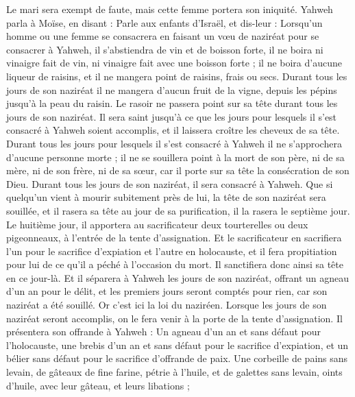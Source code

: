\begin{multicols}{2}
Le mari sera exempt de faute, mais cette femme portera son iniquité.
\VerseOne{}Yahweh parla à Moïse, en disant :
Parle aux enfants d'Israël, et dis-leur : Lorsqu'un homme ou une femme se consacrera en faisant un vœu de naziréat pour se consacrer à Yahweh,
il s'abstiendra de vin et de boisson forte, il ne boira ni vinaigre fait de vin, ni vinaigre fait avec une boisson forte ; il ne boira d'aucune liqueur de raisins, et il ne mangera point de raisins, frais ou secs.
Durant tous les jours de son naziréat il ne mangera d'aucun fruit de la vigne, depuis les pépins jusqu'à la peau du raisin.
Le rasoir ne passera point sur sa tête durant tous les jours de son naziréat. Il sera saint jusqu'à ce que les jours pour lesquels il s'est consacré à Yahweh soient accomplis, et il laissera croître les cheveux de sa tête.
Durant tous les jours pour lesquels il s'est consacré à Yahweh il ne s'approchera d'aucune personne morte ;
il ne se souillera point à la mort de son père, ni de sa mère, ni de son frère, ni de sa sœur, car il porte sur sa tête la consécration de son Dieu.
Durant tous les jours de son naziréat, il sera consacré à Yahweh.
Que si quelqu'un vient à mourir subitement près de lui, la tête de son naziréat sera souillée, et il rasera sa tête au jour de sa purification, il la rasera le septième jour.
Le huitième jour, il apportera au sacrificateur deux tourterelles ou deux pigeonneaux, à l'entrée de la tente d'assignation.
Et le sacrificateur en sacrifiera l'un pour le sacrifice d'expiation et l'autre en holocauste, et il fera propitiation pour lui de ce qu'il a péché à l'occasion du mort. Il sanctifiera donc ainsi sa tête en ce jour-là.
Et il séparera à Yahweh les jours de son naziréat, offrant un agneau d'un an pour le délit, et les premiers jours seront comptés pour rien, car son naziréat a été souillé.
Or c'est ici la loi du naziréen. Lorsque les jours de son naziréat seront accomplis, on le fera venir à la porte de la tente d'assignation.
Il présentera son offrande à Yahweh : Un agneau d'un an et sans défaut pour l'holocauste, une brebis d'un an et sans défaut pour le sacrifice d'expiation, et un bélier sans défaut pour le sacrifice d'offrande de paix.
Une corbeille de pains sans levain, de gâteaux de fine farine, pétrie à l'huile, et de galettes sans levain, oints d'huile, avec leur gâteau, et leurs libations ;

\end{multicols}
